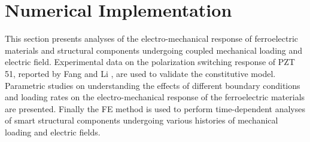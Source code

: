 \section{Numerical Implementation}
This section presents analyses of the electro-mechanical response of ferroelectric materials and structural components undergoing coupled mechanical loading and electric field. 
Experimental data on the polarization switching response of PZT 51, reported by Fang and Li \cite{Li2004959}, are used to validate the constitutive model. 
Parametric studies on understanding the effects of different boundary conditions and loading rates on the electro-mechanical response of the ferroelectric materials are presented. 
Finally the FE method is used to perform time-dependent analyses of smart structural components undergoing various histories of mechanical loading and electric fields.

